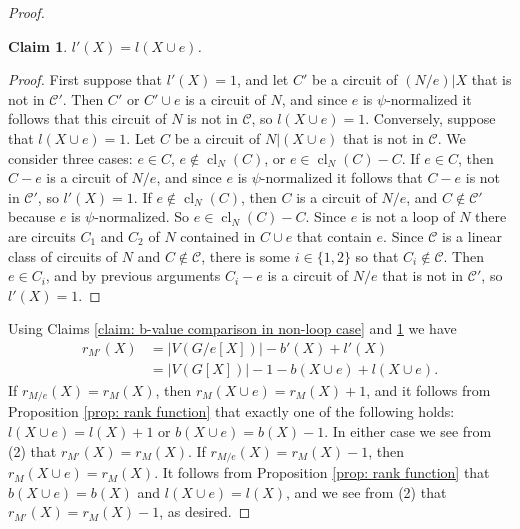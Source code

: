 \documentclass[12pt]{article}
\newtheorem{claim}{Claim}[theorem]
\theoremstyle{definition}
\newcommand{\cC}{\mathcal{C}}
\DeclareMathOperator{\cl}{cl}
\begin{document}
\begin{proof}
\begin{claim} \label{claim: l-value comparison in non-loop case}
$l'(X) = l(X \cup e)$.
\end{claim}
\begin{proof}
First suppose that $l'(X) = 1$, and let $C'$ be a circuit of $(N/e)|X$ that is not in $\cC'$.
Then $C'$ or $C' \cup e$ is a circuit of $N$, and since $e$ is $\psi$-normalized it follows that this circuit of $N$ is not in $\cC$, so $l(X \cup e) = 1$.
Conversely, suppose that $l(X \cup e) = 1$.
Let $C$ be a circuit of $N|(X \cup e)$ that is not in $\cC$.
We consider three cases: $e \in C$, $e \notin \cl_N(C)$, or $e \in \cl_N(C) - C$.
If $e \in C$, then $C - e$ is a circuit of $N/e$, and since $e$ is $\psi$-normalized it follows that $C - e$ is not in $\cC'$, so $l'(X) = 1$.   
If $e \notin \cl_N(C)$, then $C$ is a circuit of $N/e$, and $C \notin \cC'$ because $e$ is $\psi$-normalized.
So $e \in \cl_N(C) - C$.
Since $e$ is not a loop of $N$ there are circuits $C_1$ and $C_2$ of $N$ contained in $C \cup e$ that contain $e$.
Since $\cC$ is a linear class of circuits of $N$ and $C \notin \cC$, there is some $i \in \{1,2\}$ so that $C_i \notin \cC$.
Then $e \in C_i$, and by previous arguments $C_i - e$ is a circuit of $N/e$ that is not in $\cC'$, so $l'(X) = 1$.
\end{proof}


Using Claims \ref{claim: b-value comparison in non-loop case} and \ref{claim: l-value comparison in non-loop case} we have
\begin{align}
    r_{M'}(X) &= |V(G/e[X])| - b'(X) + l'(X) \\
    &= |V(G[X])| - 1 - b(X \cup e) + l(X \cup e).
\end{align}
If $r_{M/e}(X) = r_M(X)$, then $r_M(X \cup e) = r_M(X) + 1$, and it follows from Proposition \ref{prop: rank function} that exactly one of the following holds: $l(X \cup e) = l(X) + 1$ or $b(X \cup e) = b(X) - 1$.
In either case we see from (2) that $r_{M'}(X) = r_M(X)$.
If $r_{M/e}(X) = r_M(X) - 1$, then $r_M(X \cup e) = r_M(X)$. 
It follows from Proposition \ref{prop: rank function} that $b(X \cup e) = b(X)$ and $l(X \cup e) = l(X)$, and we see from (2) that $r_{M'}(X) = r_M(X) - 1$, as desired.
\end{proof}
\end{document}
